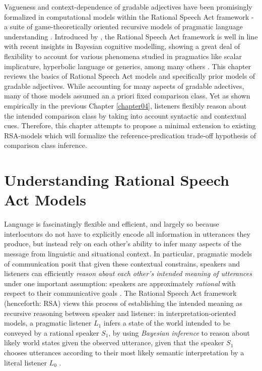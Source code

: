 Vagueness and context-dependence of gradable adjectives have been promisingly formalized in computational models within the Rational Speech Act framework -  a suite of game-theoretically oriented recursive models of pragmatic language understanding \parencite[e.g.,][]{goodman2016, lassiter2017adjectival, tessler2017warm}. Introduced by \textcite{frank2012predicting}, the Rational Speech Act framework is well in line with recent insights in Bayesian cognitive modelling, showing a great deal of flexibility to account for various phenomena studied in pragmatics like scalar implicature, hyperbolic language or generics, among many others \parencite[e.g.,][]{tenenbaum2011grow, problang}. This chapter reviews the basics of Rational Speech Act models and specifically prior models of gradable adjectives. While accounting for many aspects of gradable adectives, many of those models assumed an a priori fixed comparison class. Yet as shown empirically in the previous Chapter \ref{chapter04}, listeners flexibly reason about the intended comparison class by taking into account syntactic and contextual cues. Therefore, this chapter attempts to propose a minimal extension to existing RSA-models which will formalize the reference-predication trade-off hypothesis of comparison class inference.%
  
\section{Understanding Rational Speech Act Models}
\label{intro-rsa}
Language is fascinatingly flexible and efficient, and largely so because interlocutors do not have to explicitly encode all information in utterances they produce, but instead rely on each other's ability to infer many aspects of the message from linguistic and situational context. In particular, pragmatic models of communication posit that given these contextual constrains, speakers and listeners can efficiently \emph{reason about each other's intended meaning of utterances} under one important assumption: speakers are approximately \emph{rational} with respect to their communicative goals \parencite{frank2012predicting}. The Rational Speech Act framework (henceforth: RSA) views this process of establishing the intended meaning as recursive reasoning between speaker and listener: in interpretation-oriented models, a pragmatic listener $L_1$ infers a state of the world intended to be conveyed by a rational speaker $S_1$, by using \emph{Bayesian inference} to reason about likely world states given the observed utterance, given that the speaker $S_1$ chooses utterances according to their most likely semantic interpretation by a literal listener $L_0$ \parencite{problang}.  

